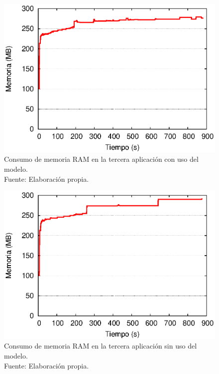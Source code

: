 \begin{figure}[!ht]
	\centering
	\captionsetup{justification=centering}
    \includegraphics[scale=0.7]{images/exp/app3/cm/fisical/consumeRAM.eps}
    \caption[Consumo de memoria RAM en la tercera aplicación con uso del modelo.]{Consumo de memoria RAM en la tercera aplicación con uso del modelo.\\Fuente: Elaboración propia.}
    \label{fig:app3-consumeRAM-cm}
\end{figure}

\begin{figure}[!ht]
	\centering
	\captionsetup{justification=centering}
    \includegraphics[scale=0.7]{images/exp/app3/sm/fisical/consumeRAM.eps}
    \caption[Consumo de memoria RAM en la tercera aplicación sin uso del modelo.]{Consumo de memoria RAM en la tercera aplicación sin uso del modelo.\\Fuente: Elaboración propia.}
    \label{fig:app3-consumeRAM-sm}
\end{figure}

